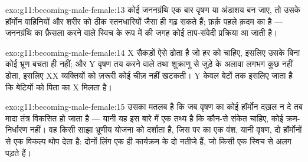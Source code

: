 \begin{solution}{exo:g11:becoming-male-female:13}
कोई जननग्रंथि एक बार वृषण या अंडाशय बन जाए, तो उसके हॉर्मोन वाहिनियों और
शरीर को ठीक स्तनधारियों जैसा ही गढ़ सकते हैं; फ़र्क़ पहले क़दम का है ---
जननग्रंथि का फ़ैसला करने वाले स्विच के रूप में  की जगह कोई ताप-संवेदी
प्रक्रिया आ जाती है।
\end{solution}

\begin{solution}{exo:g11:becoming-male-female:14}
X सैकड़ों ऐसे  ढोता है जो हर  को चाहिए, इसलिए उसके बिना कोई भ्रूण
बचता ही नहीं; और Y वृषण तय करने वाले तथा शुक्राणु से जुड़े  के अलावा
लगभग कुछ नहीं ढोता, इसलिए XX व्यक्तियों को ज़रूरी कोई चीज़ नहीं खटकती। Y
केवल बेटों तक इसलिए जाता है कि बेटियों को पिता का X मिलता है।
\end{solution}

\begin{solution}{exo:g11:becoming-male-female:15}
उसका मतलब है कि जब वृषण का कोई हॉर्मोन दख़ल न दे तब मादा तंत्र विकसित हो
जाता है --- यानी यह इस बारे में एक तथ्य है कि कौन-से संकेत चाहिए, कोई
क्रम-निर्धारण नहीं। वह किसी साझा भ्रूणीय योजना को दर्शाता है, जिस पर
 का एक वंश, यानी वृषण, दो हॉर्मोनों से एक विकल्प थोप देता है:
दोनों लिंग एक ही कार्यक्रम के दो नतीजे हैं, जो किसी एक स्विच से अलग पड़ते
हैं।
\end{solution}

